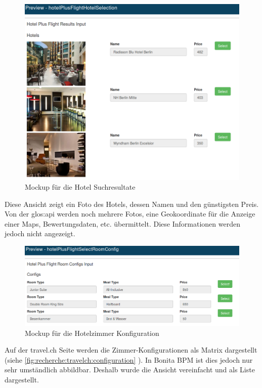 \begin{figure}[H]
	\centering
	\includegraphics[width=1\textwidth]{images/forms-select-hotel.png}
	\caption{Mockup für die Hotel Suchresultate}
	\label{fig:konzept:mockups:selecthotel}
\end{figure}
Diese Ansicht zeigt ein Foto des Hotels, dessen Namen und den günstigsten Preis. Von der \Gls{glos:api} werden noch mehrere Fotos, eine Geokoordinate für die Anzeige einer Maps, Bewertungsdaten, etc. übermittelt. Diese Informationen werden jedoch nicht angezeigt.

\begin{figure}[H]
	\centering
	\includegraphics[width=1\textwidth]{images/forms-select-roomconfig.png}
	\caption{Mockup für die Hotelzimmer Konfiguration}
	\label{fig:konzept:mockups:selectroomconfig}
\end{figure}
Auf der travel.ch Seite werden die Zimmer-Konfigurationen als Matrix dargestellt (siehe \cref{fig:recherche:travelch:configuration} ). In Bonita BPM ist dies jedoch nur sehr umständlich abbildbar. Deshalb wurde die Ansicht vereinfacht und als Liste dargestellt.

